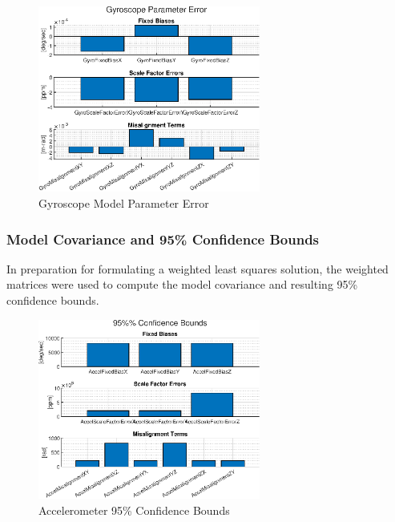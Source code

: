 \begin{figure}[h] 
	\centering
	\includegraphics[width=0.65\textwidth]{./images/SAM_gyro_model_error.eps}
	\caption{Gyroscope Model Parameter Error}
	\label{fig: single-axis gyroscope parameter error}
\end{figure}
\FloatBarrier


\subsubsection{Model Covariance and 95\% Confidence Bounds}

In preparation for formulating a weighted least squares solution, the weighted matrices were used to compute the model covariance and resulting 95\% confidence bounds. 

\begin{figure}[h] 
	\centering
	\includegraphics[width=0.65\textwidth]{./images/SAM_accel_model_95_confidence_bounds.eps}
	\caption{Accelerometer 95\% Confidence Bounds}
	\label{fig: single-axis accel 95 confidence bounds}
\end{figure}
\FloatBarrier

